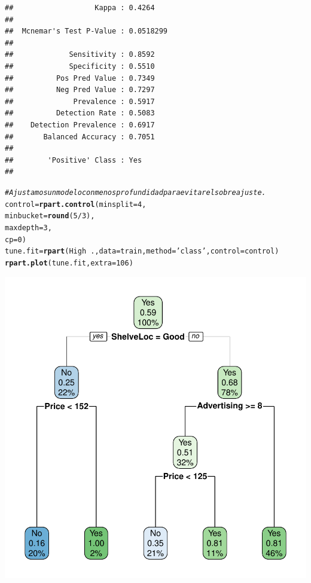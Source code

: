 \documentclass{article}\usepackage[]{graphicx}\usepackage[]{xcolor}
\makeatletter
\newcommand{\hlnum}[1]{\textcolor[rgb]{0.686,0.059,0.569}{#1}}%
\newcommand{\hlstr}[1]{\textcolor[rgb]{0.192,0.494,0.8}{#1}}%
\newcommand{\hlcom}[1]{\textcolor[rgb]{0.678,0.584,0.686}{\textit{#1}}}%
\newcommand{\hlopt}[1]{\textcolor[rgb]{0,0,0}{#1}}%
\newcommand{\hlstd}[1]{\textcolor[rgb]{0.345,0.345,0.345}{#1}}%
\newcommand{\hlkwb}[1]{\textcolor[rgb]{0.69,0.353,0.396}{#1}}%
\newcommand{\hlkwc}[1]{\textcolor[rgb]{0.333,0.667,0.333}{#1}}%
\newcommand{\hlkwd}[1]{\textcolor[rgb]{0.737,0.353,0.396}{\textbf{#1}}}%
\newenvironment{kframe}{%
 \def\at@end@of@kframe{}%
 \ifinner\ifhmode%
  \def\at@end@of@kframe{\end{minipage}}%
  \begin{minipage}{\columnwidth}%
 \fi\fi%
 \def\FrameCommand##1{\hskip\@totalleftmargin \hskip-\fboxsep
 \colorbox{shadecolor}{##1}\hskip-\fboxsep
     \hskip-\linewidth \hskip-\@totalleftmargin \hskip\columnwidth}%
 \MakeFramed {\advance\hsize-\width
   \@totalleftmargin\z@ \linewidth\hsize
   \@setminipage}}%
 {\par\unskip\endMakeFramed%
 \at@end@of@kframe}
\newenvironment{knitrout}{}{} %
\makeatother
\begin{document}
\begin{knitrout}
\begin{kframe}
\begin{verbatim}
##                   Kappa : 0.4264          
##                                           
##  Mcnemar's Test P-Value : 0.0518299       
##                                           
##             Sensitivity : 0.8592          
##             Specificity : 0.5510          
##          Pos Pred Value : 0.7349          
##          Neg Pred Value : 0.7297          
##              Prevalence : 0.5917          
##          Detection Rate : 0.5083          
##    Detection Prevalence : 0.6917          
##       Balanced Accuracy : 0.7051          
##                                           
##        'Positive' Class : Yes             
## 
\end{verbatim}
\begin{alltt}
\hlcom{# Ajustamos un modelo con menos profundidad para evitar el sobreajuste.}
\hlstd{control} \hlkwb{=} \hlkwd{rpart.control}\hlstd{(}\hlkwc{minsplit} \hlstd{=} \hlnum{4}\hlstd{,}
                         \hlkwc{minbucket} \hlstd{=} \hlkwd{round}\hlstd{(}\hlnum{5} \hlopt{/} \hlnum{3}\hlstd{),}
                         \hlkwc{maxdepth} \hlstd{=} \hlnum{3}\hlstd{,}
                         \hlkwc{cp} \hlstd{=} \hlnum{0}\hlstd{)}
\hlstd{tune.fit} \hlkwb{=} \hlkwd{rpart}\hlstd{(High}\hlopt{~}\hlstd{.,} \hlkwc{data} \hlstd{= train,} \hlkwc{method} \hlstd{=} \hlstr{'class'}\hlstd{,} \hlkwc{control} \hlstd{= control)}
\hlkwd{rpart.plot}\hlstd{(tune.fit,} \hlkwc{extra} \hlstd{=} \hlnum{106}\hlstd{)}
\end{alltt}
\end{kframe}

{\centering \includegraphics[width=.6\linewidth]{figure/TREE1-SOLUCION-Rnwauto-report-4} 

}



\end{knitrout}
\end{document}
